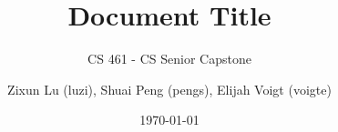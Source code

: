 



\title{Document Title}
\subtitle{CS 461 - CS Senior Capstone}
\author{Zixun Lu (luzi), Shuai Peng (pengs), Elijah Voigt (voigte)}
\date{\today}
\maketitle








